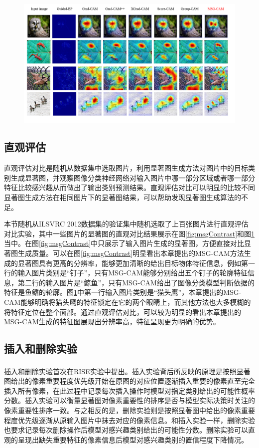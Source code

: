 \begin{figure}[h]
	\centering 
	\includegraphics[width=15cm]{fig/ch3/msgContrast2.png}
	\label{fig:msgContrast2}
\end{figure}
\subsection{直观评估}
直观评估对比是随机从数据集中选取图片，利用显著图生成方法对图片中的目标类别生成显著图，并观察图像分类神经网络对输入图片中哪一部分区域或者哪一部分特征比较感兴趣从而做出了输出类别预测结果。直观评估对比可以明显的比较不同显著图生成方法在相同图片下的显著图结果，可以帮助发现显著图生成算法的不足。

本节随机从ILSVRC 2012数据集的验证集中随机选取了上百张图片进行直观评估对比实验，其中一些图片的显著图的直观对比结果展示在图\ref{fig:msgContrast}和图\ref{fig:msgContrast2}当中。在图\ref{fig:msgContrast}中只展示了输入图片生成的显著图，方便直接对比显著图生成质量。可以在图\ref{fig:msgContrast}明显看出本章提出的MSG-CAM方法生成的显著图具有更高的分辨率，能够更加清晰的给出目标物体特征信息，例如第一行的输入图片类别是“钉子”，只有MSG-CAM能够分别给出五个钉子的轮廓特征信息，第二行的输入图片是“鲸鱼”，只有MSG-CAM给出了图像分类模型判断依据的特征是鱼鳍的轮廓。图\ref{fig:msgContrast2}中第一行输入图片类别是“猫头鹰”，本章提出的MSG-CAM能够明确将猫头鹰的特征锁定在它的两个眼睛上，而其他方法也大多模糊的将特征定位在整个面部。通过直观评估对比，可以较为明显的看出本章提出的MSG-CAM生成的特征图展现出分辨率高，特征呈现更为明确的优势。



\subsection{插入和删除实验}
插入和删除实验首次在RISE\textsuperscript{\cite{petsiuk2018rise}}实验中提出。插入实验背后所反映的原理是按照显著图给出的像素重要程度优先级开始在原图的对应位置逐渐插入重要的像素直至完全插入所有像素，在此过程中记录每次插入操作时模型对指定类别给出的可能性概率分数。插入实验可以衡量显著图对像素重要性的排序是否与模型实际决策时关注的像素重要性排序一致。与之相反的是，删除实验则是按照显著图中给出的像素重要程度优先级逐渐从原输入图片中抹去对应的像素信息。和插入实验一样，删除实验也要求记录每次删除操作后模型对感兴趣类别给出的可能性分数。删除实验可以直观的呈现出缺失重要特征的像素信息后模型对感兴趣类别的置信程度下降情况。

